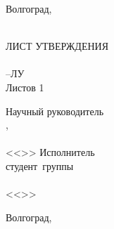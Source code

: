 {{\begin{center}
Волгоград,~\the\year
\end{center}
\newpage
\clearpage
\thispagestyle{empty}
\hfill\VSTUTitleHeadApproval
\vspace{\fill}
\begin{center}
\VSTUTitle\\
\vspace{8mm}
ЛИСТ УТВЕРЖДЕНИЯ\\
\VSTUDocumentCode\\
\VSTULUCode--ЛУ\\
Листов 1\\
\vspace{\fill}
\end{center}
\begin{flushright}
\begin{minipage}[c]{15em}
Научный руководитель\\
\VSTUDirectorDegree,~\VSTUDirectorPost\\
\makebox[2cm]{\hrulefill}\VSTUDirectorName\\
<<\makebox[1.5cm]{\hrulefill}>>\makebox[3.5cm]{\hrulefill}\the\year
\vspace{8mm}
Исполнитель\\
студент~группы~\VSTUStudentGroup\\
\makebox[2cm]{\hrulefill}\VSTUStudentName\\
<<\makebox[1.5cm]{\hrulefill}>>\makebox[3.5cm]{\hrulefill}\the\year
\end{minipage}
\end{flushright}
\vspace{\fill}
\begin{center}
Волгоград,~\the\year
\end{center}
\newpage
}
}
